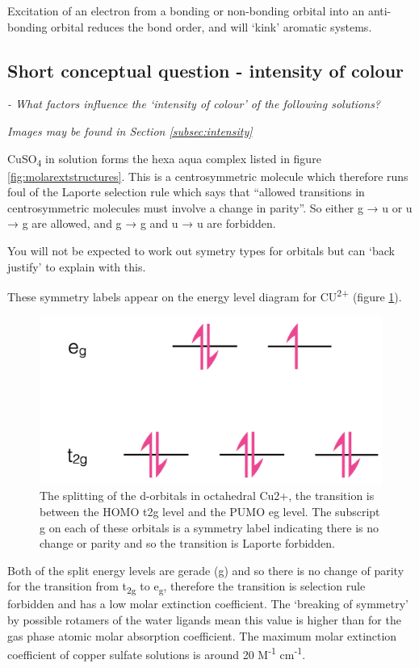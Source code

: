 \documentclass[
]{book}
\begin{document}
Excitation of an electron from a bonding or non-bonding orbital into an anti-bonding orbital reduces the bond order, and will `kink' aromatic systems.

\hypertarget{subsec:intensityans}{%
\subsection{Short conceptual question - intensity of colour}\label{subsec:intensityans}}

\emph{- What factors influence the `intensity of colour' of the following solutions?}

\emph{Images may be found in Section \ref{subsec:intensity}}

CuSO\textsubscript{4} in solution forms the hexa aqua complex listed in figure \ref{fig:molarextstructures}. This is a centrosymmetric molecule which therefore runs foul of the Laporte selection rule which says that ``allowed transitions in centrosymmetric molecules must involve a change in parity''. So either g → u or u → g are allowed, and g → g and u → u are forbidden.

You will not be expected to work out symetry types for orbitals but can `back justify' to explain with this.

These symmetry labels appear on the energy level diagram for CU\textsuperscript{2+} (figure \ref{fig:Cu}).

\begin{figure}

{\centering \includegraphics[width=0.4\linewidth]{images/CuIIenergylevels} 

}

\caption{The splitting of the d-orbitals in octahedral Cu2+, the transition is between the HOMO t2g level and the PUMO eg level. The subscript g on each of these orbitals is a symmetry label indicating there is no change or parity and so the transition is Laporte forbidden.}\label{fig:Cu}
\end{figure}

Both of the split energy levels are gerade (g) and so there is no change of parity for the transition from t\textsubscript{2g} to e\textsubscript{g}, therefore the transition is selection rule forbidden and has a low molar extinction coefficient. The `breaking of symmetry' by possible rotamers of the water ligands mean this value is higher than for the gas phase atomic molar absorption coefficient. The maximum molar extinction coefficient of copper sulfate solutions is around 20 M\textsuperscript{-1} cm\textsuperscript{-1}.
\end{document}
